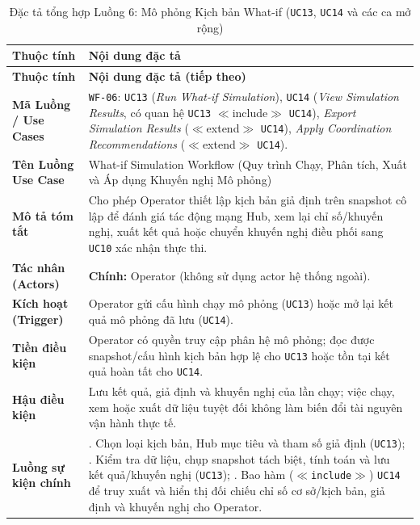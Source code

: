 {\small
\begin{longtable}{>{\raggedright\arraybackslash\bfseries}p{3.5cm} >{\raggedright\arraybackslash}p{\dimexpr\textwidth-3.5cm-4\tabcolsep\relax}}
\caption{Đặc tả tổng hợp Luồng 6: Mô phỏng Kịch bản What-if (\texttt{UC13}, \texttt{UC14} và các ca mở rộng)} \label{tab:wf-sim} \\
\toprule
Thuộc tính & \textbf{Nội dung đặc tả} \\
\midrule
\endfirsthead
\toprule
Thuộc tính & \textbf{Nội dung đặc tả (tiếp theo)} \\
\midrule
\endhead
\bottomrule
\endfoot
Mã Luồng / Use Cases & \texttt{WF-06}: \texttt{UC13} (\textit{Run What-if Simulation}), \texttt{UC14} (\textit{View Simulation Results}, có quan hệ \texttt{UC13} $\ll$include$\gg$ \texttt{UC14}), \textit{Export Simulation Results} ($\ll$extend$\gg$ \texttt{UC14}), \textit{Apply Coordination Recommendations} ($\ll$extend$\gg$ \texttt{UC14}). \\
Tên Luồng Use Case & What-if Simulation Workflow (Quy trình Chạy, Phân tích, Xuất và Áp dụng Khuyến nghị Mô phỏng) \\
Mô tả tóm tắt & Cho phép Operator thiết lập kịch bản giả định trên snapshot cô lập để đánh giá tác động mạng Hub, xem lại chỉ số/khuyến nghị, xuất kết quả hoặc chuyển khuyến nghị điều phối sang \texttt{UC10} xác nhận thực thi. \\
Tác nhân (Actors) & \textbf{Chính:} Operator (không sử dụng actor hệ thống ngoài). \\
Kích hoạt (Trigger) & Operator gửi cấu hình chạy mô phỏng (\texttt{UC13}) hoặc mở lại kết quả mô phỏng đã lưu (\texttt{UC14}). \\
Tiền điều kiện & Operator có quyền truy cập phân hệ mô phỏng; đọc được snapshot/cấu hình kịch bản hợp lệ cho \texttt{UC13} hoặc tồn tại kết quả hoàn tất cho \texttt{UC14}. \\
Hậu điều kiện & Lưu kết quả, giả định và khuyến nghị của lần chạy; việc chạy, xem hoặc xuất dữ liệu tuyệt đối không làm biến đổi tài nguyên vận hành thực tế. \\
Luồng sự kiện chính & 1. Chọn loại kịch bản, Hub mục tiêu và tham số giả định (\texttt{UC13}); \newline 2. Kiểm tra dữ liệu, chụp snapshot tách biệt, tính toán và lưu kết quả/khuyến nghị (\texttt{UC13}); \newline 3. Bao hàm (\texttt{$\ll$include$\gg$}) \texttt{UC14} để truy xuất và hiển thị đối chiếu chỉ số cơ sở/kịch bản, giả định và khuyến nghị cho Operator. \\

\end{longtable}}
